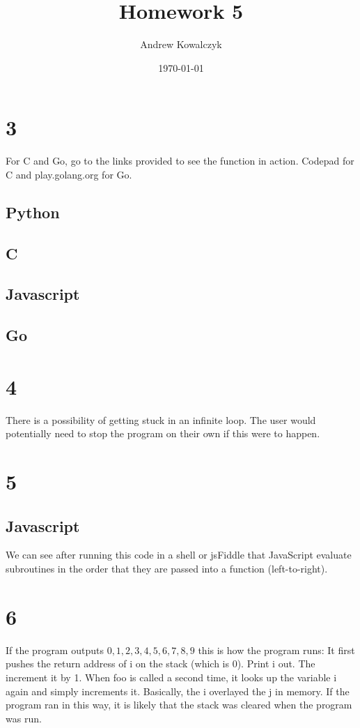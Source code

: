 \documentclass[11pt, oneside]{article}
\title{Homework 5}
\author{Andrew Kowalczyk}
\date{\today}							%
\begin{document}
\maketitle

\section*{3}
For C and Go, go to the links provided to see the function in action. Codepad for C and play.golang.org for Go.

\subsection*{Python}


\subsection*{C}


\subsection*{Javascript}


\subsection*{Go}


\section*{4}
There is a possibility of getting stuck in an infinite loop. The user would potentially need to stop the program on their own if this were to happen.

\section*{5}
\subsection*{Javascript}


We can see after running this code in a shell or jsFiddle that JavaScript evaluate subroutines in the order that they are passed into a function (left-to-right).

\section*{6}
If the program outputs $0, 1, 2, 3, 4, 5, 6, 7, 8, 9$ this is how the program runs: It first pushes the return address of i on the stack (which is 0). Print i out. The increment it by 1. When foo is called a second time, it looks up the variable i again and simply increments it. Basically, the i overlayed the j in memory. If the program ran in this way, it is likely that the stack was cleared when the program was run.
\end{document}
